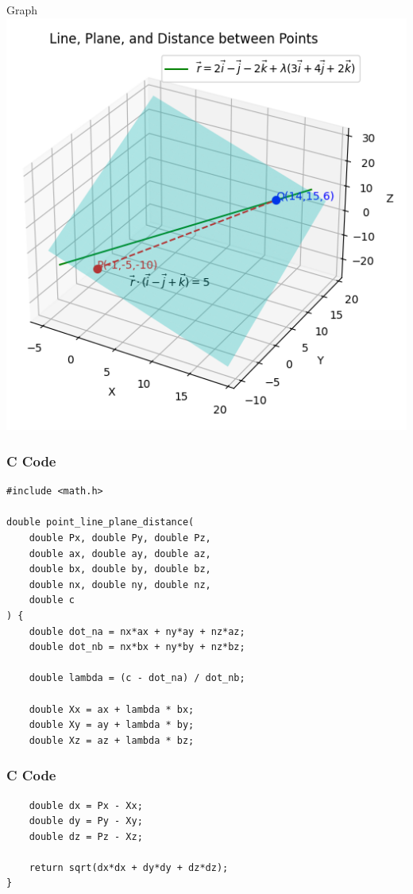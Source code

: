 \documentclass{beamer}
\begin{document}
\begin{frame}{Graph}
\centering
\includegraphics[height=0.7\textheight]{figs/q8.png}
\end{frame}


\begin{frame}[fragile]
    \frametitle{C Code}
\begin{lstlisting}
#include <math.h>

double point_line_plane_distance(
    double Px, double Py, double Pz,
    double ax, double ay, double az,
    double bx, double by, double bz,
    double nx, double ny, double nz,
    double c
) {
    double dot_na = nx*ax + ny*ay + nz*az;
    double dot_nb = nx*bx + ny*by + nz*bz;

    double lambda = (c - dot_na) / dot_nb;

    double Xx = ax + lambda * bx;
    double Xy = ay + lambda * by;
    double Xz = az + lambda * bz;
\end{lstlisting}
\end{frame}

\begin{frame}[fragile]
    \frametitle{C Code}
\begin{lstlisting}
    double dx = Px - Xx;
    double dy = Py - Xy;
    double dz = Pz - Xz;

    return sqrt(dx*dx + dy*dy + dz*dz);
}

\end{lstlisting}
\end{frame}
\end{document}
